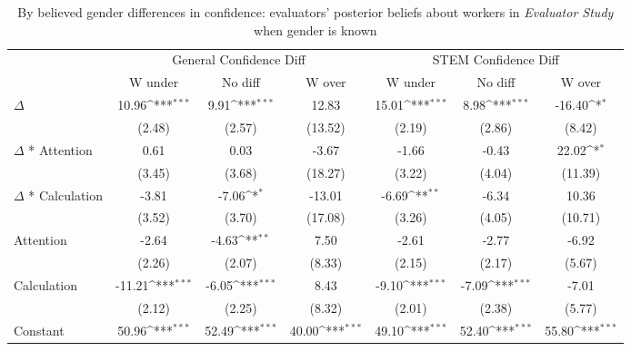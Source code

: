 \begin{table}[htbp]\centering
\def\sym#1{\ifmmode^{#1}\else\(^{#1}\)\fi}
\caption{By believed gender differences in confidence: evaluators' posterior beliefs about workers in \textit{Evaluator Study} when gender is known}
\begin{tabular}{l*{6}{c}}
\hline\hline
                &\multicolumn{3}{c}{General Confidence Diff}             &\multicolumn{3}{c}{STEM Confidence Diff}                \\\cmidrule(lr){2-4}\cmidrule(lr){5-7}
                &\multicolumn{1}{c}{W under}&\multicolumn{1}{c}{No diff}&\multicolumn{1}{c}{W over}&\multicolumn{1}{c}{W under}&\multicolumn{1}{c}{No diff}&\multicolumn{1}{c}{W over}\\
\hline
$\Delta$        &    10.96\sym{***}&     9.91\sym{***}&    12.83         &    15.01\sym{***}&     8.98\sym{***}&   -16.40\sym{*}  \\
                &   (2.48)         &   (2.57)         &  (13.52)         &   (2.19)         &   (2.86)         &   (8.42)         \\
$\Delta$ * Attention&     0.61         &     0.03         &    -3.67         &    -1.66         &    -0.43         &    22.02\sym{*}  \\
                &   (3.45)         &   (3.68)         &  (18.27)         &   (3.22)         &   (4.04)         &  (11.39)         \\
$\Delta$ * Calculation&    -3.81         &    -7.06\sym{*}  &   -13.01         &    -6.69\sym{**} &    -6.34         &    10.36         \\
                &   (3.52)         &   (3.70)         &  (17.08)         &   (3.26)         &   (4.05)         &  (10.71)         \\
Attention       &    -2.64         &    -4.63\sym{**} &     7.50         &    -2.61         &    -2.77         &    -6.92         \\
                &   (2.26)         &   (2.07)         &   (8.33)         &   (2.15)         &   (2.17)         &   (5.67)         \\
Calculation     &   -11.21\sym{***}&    -6.05\sym{***}&     8.43         &    -9.10\sym{***}&    -7.09\sym{***}&    -7.01         \\
                &   (2.12)         &   (2.25)         &   (8.32)         &   (2.01)         &   (2.38)         &   (5.77)         \\
Constant        &    50.96\sym{***}&    52.49\sym{***}&    40.00\sym{***}&    49.10\sym{***}&    52.40\sym{***}&    55.80\sym{***}\\

\end{tabular}
\end{table}
